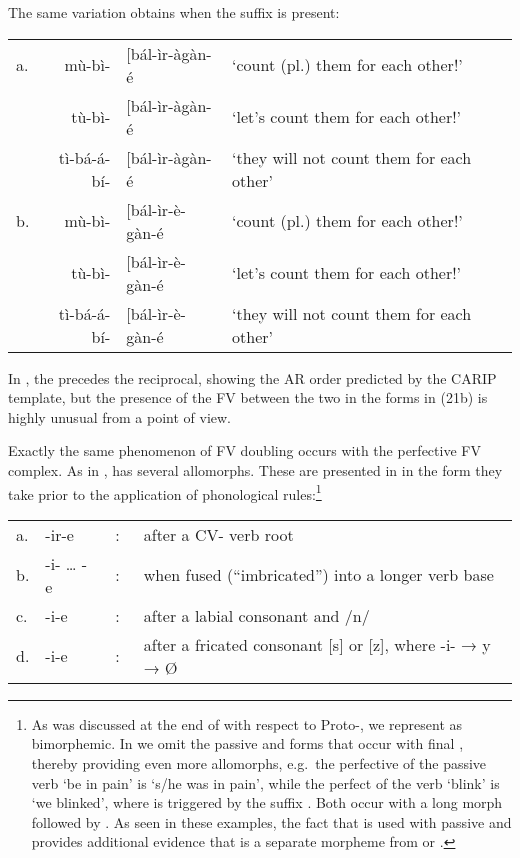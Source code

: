 \documentclass[output=paper,
modfonts
]{LSP/langsci}
\begin{document}
The same variation obtains when the  suffix is present:

\ea \label{ex:hyman:21}\begin{tabularx}{\linewidth}[t]{@{}lr@{}ll>{\raggedright\arraybackslash}X@{}}
a. & mù-bì- & {[}bál-ìr-àgàn-é & `count (pl.) them for each other!'\\
 & tù-bì- & {[}bál-ìr-àgàn-é & `let's count them for each other!'\\
 & tì-bá-á-bí- & {[}bál-ìr-àgàn-é & `they will not count them for each other'\\
b. & mù-bì- & {[}bál-ìr-è-gàn-é & `count (pl.) them for each other!'\\
 & tù-bì- & {[}bál-ìr-è-gàn-é & `let's count them for each other!'\\
 & tì-bá-á-bí- & {[}bál-ìr-è-gàn-é & `they will not count them for each other'\\
\end{tabularx}
\z

\noindent In , the   precedes the reciprocal, showing
the AR order predicted by the CARIP template, but the presence of the FV
between the two in the forms in (21b) is highly unusual from a 
point of view.

Exactly the same phenomenon of FV doubling occurs with the perfective
 FV complex. As in ,   has several
allomorphs. These are presented in  in the form they take prior to
the application of phonological rules:\footnote{As was discussed at the
  end of  with respect to Proto-, we represent  as
  bimorphemic. In  we omit the passive and  forms that
  occur with final , thereby providing even more allomorphs,
  e.g.\ the perfective of the  passive verb 
  `be in pain' is \form{tù-{[}lùm-íír-w-à} `s/he was in pain', while the
  perfect of the   verb  `blink' is
  \form{tù-{[}tèm-ííz-à} `we blinked', where  is triggered
  by the  suffix . Both occur with a long 
  morph followed by . As seen in these examples, the fact that
   is used with passive  and  
  provides additional evidence that  is a separate morpheme
  from  or .}

\ea \label{ex:hyman:22}\begin{tabular}[t]{@{}ll@{}l@{}l}
a. & -ir-e & {\ :\ } & after a CV- verb root\\
b. & -i- \dots{} -e & {\ :\ } & when fused (``imbricated'') into a longer verb base\\
c. & -i-e & {\ :\ } & after a labial consonant and /n/\\
d. & -i-e & {\ :\ } & after a fricated consonant {[}s{]} or {[}z{]}, where -i- → y → Ø
\end{tabular}
\z
\end{document}

